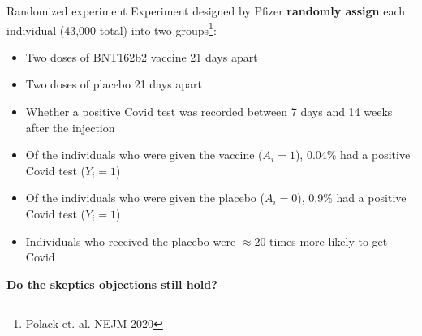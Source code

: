 \documentclass{beamer}
\begin{document}
\begin{frame}{Randomized experiment}
Experiment designed by Pfizer \textbf{randomly assign} each individual (43,000 total) into two groups\footnote{Polack et. al. NEJM 2020}:
\begin{itemize}
        \item Two doses of BNT162b2 vaccine 21 days apart
        \item Two doses of placebo 21 days apart
        \item Whether a positive Covid test was recorded between 7 days and 14 weeks after the injection
\end{itemize}
\vspace{1em}

\pause
     \begin{itemize}
         \item Of the individuals who were given the vaccine ($A_i = 1$), 0.04\% had a positive Covid test ($Y_i = 1$)
         \item Of the individuals who were given the placebo ($A_i = 0$), 0.9\% had a positive Covid test ($Y_i = 1$)
         \item Individuals who received the placebo were $\approx 20$ times more likely to get Covid 
     \end{itemize}

\pause \vspace{1em}
\textbf{Do the skeptics objections still hold?}


\end{frame}
\end{document}
